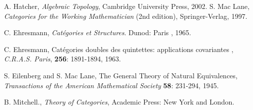 \documentclass[12pt]{article}
\begin{document}
\begin{thebibliography}{9}

A. Hatcher, \emph{Algebraic Topology}, Cambridge University Press, 2002.
S. Mac Lane, \emph{Categories for the Working Mathematician} (2nd edition), Springer-Verlag, 1997.


C. Ehresmann, \emph{Cat\'egories et Structures}. Dunod: Paris , 1965.

C. Ehresmann, Cat\'egories doubles des quintettes: applications covariantes
, \emph{C.R.A.S. Paris}, \textbf{256}: 1891-1894, 1963.



S. Eilenberg and S. Mac Lane,  The General Theory of Natural Equivalences, \emph{Transactions of the American Mathematical Society} \textbf{58}: 231-294, 1945.



B. Mitchell., \emph{Theory of Categories}, Academic Press: New York and London.


\end{thebibliography}
\end{document}
